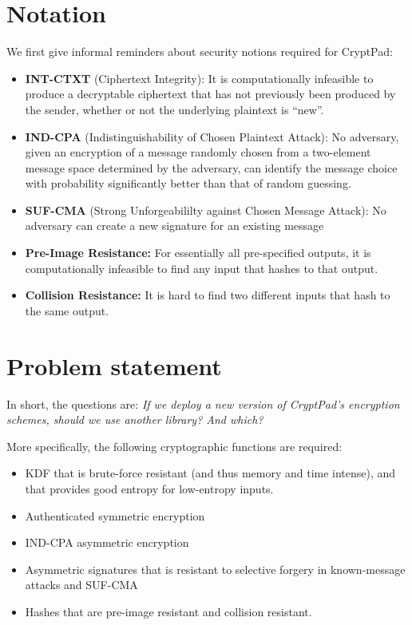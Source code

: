 \documentclass[a4paper, 11pt]{article}
\begin{document}
\tableofcontents

\section{Notation}\label{notation}

We first give informal reminders about security notions required for CryptPad:

\begin{itemize}
\item \textbf{INT-CTXT} (Ciphertext Integrity): It is computationally infeasible to produce
  a decryptable ciphertext that has not previously been produced by the sender,
  whether or not the underlying plaintext is \enquote{new}.
\item \textbf{IND-CPA} (Indistinguishability of Chosen Plaintext Attack):
  No adversary, given an encryption of a message randomly
  chosen from a two-element message space determined by
  the adversary, can identify the message choice with
  probability significantly better than that of random guessing.
\item \textbf{SUF-CMA} (Strong Unforgeabililty against Chosen Message
  Attack): No adversary can create a new signature for an existing message
\item \textbf{Pre-Image Resistance:} For essentially all pre-specified outputs, it is computationally infeasible to find any input that hashes to that output.
\item \textbf{Collision Resistance:} It is hard to find two different inputs that hash to the same output.
\end{itemize}


\section{Problem statement}\label{problem-statement}

In short, the questions are: \emph{If we deploy a new version of CryptPad's encryption schemes, should
we use another library? And which?}

More specifically, the following cryptographic functions are required:

\begin{itemize}
  \item \Ac{KDF} that is brute-force resistant (and thus memory and time intense), and that provides good entropy for low-entropy inputs.
\item Authenticated symmetric encryption
\item IND-CPA asymmetric encryption
\item Asymmetric signatures that is resistant to selective forgery in known-message attacks and SUF-CMA
\item Hashes that are pre-image resistant and collision resistant.
  \end{itemize}
\end{document}
